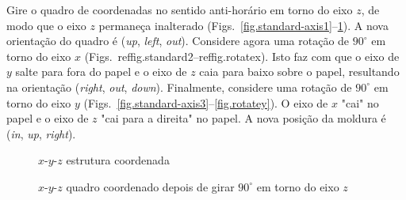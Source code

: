 Gire o quadro de coordenadas no sentido anti-horário em torno do eixo $z$, de modo que o eixo $z$ permaneça inalterado (Figs.~\ref{fig.standard-axis1}--\ref{fig.rotatez}). A nova orientação do quadro é (\textit{up}, \textit{left}, \textit{out}). Considere agora uma rotação de $90^\circ$ em torno do eixo $x$ (Figs.~ref{fig.standard2}--ref{fig.rotatex}). Isto faz com que o eixo de $y$ salte para fora do papel e o eixo de $z$ caia para baixo sobre o papel, resultando na orientação (\textit{right}, \textit{out}, \textit{down}). Finalmente, considere uma rotação de $90^\circ$ em torno do eixo $y$ (Figs.~\ref{fig.standard-axis3}--\ref{fig.rotatey}). O eixo de $x$ "cai" no papel e o eixo de $z$ "cai para a direita" no papel. A nova posição da moldura é (\textit{in}, \textit{up}, \textit{right}).

\begin{figure}
\begin{minipage}{.48\textwidth}
\caption{$x$-$y$-$z$ estrutura coordenada}\label{fig.standard-axis1}
\end{minipage}
\hspace{\fill}
\begin{minipage}{.48\textwidth}
\caption{$x$-$y$-$z$ quadro coordenado depois de girar $90^\circ$ em torno do eixo $z$}\label{fig.rotatez}
\end{minipage}
\end{figure}


